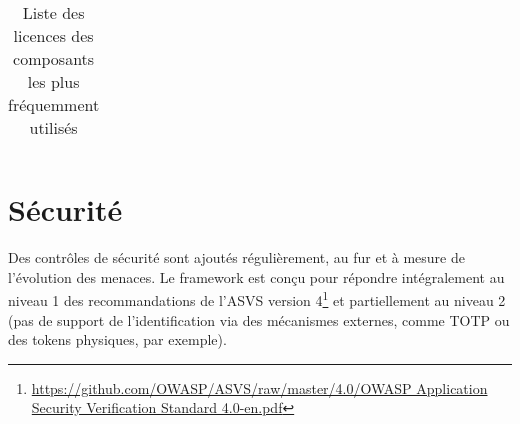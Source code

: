 \begin{longtable}{|>{\raggedright\arraybackslash}p{3cm}|p{6cm}|>{\raggedright\arraybackslash}p{1.5cm}|>{\raggedright\arraybackslash}p{1.5cm}|}
\caption{Liste des licences des composants les plus fréquemment utilisés}
\end{longtable}

\section{Sécurité}
Des contrôles de sécurité sont ajoutés régulièrement, au fur et à mesure de l'évolution des menaces. Le framework est conçu pour répondre intégralement au niveau 1 des recommandations de l'ASVS version 4\footnote{\href{https://github.com/OWASP/ASVS/raw/master/4.0/OWASP Application Security Verification Standard 4.0-en.pdf}{https://github.com/OWASP/ASVS/raw/master/4.0/OWASP Application Security Verification Standard 4.0-en.pdf}} et partiellement au niveau 2 (pas de support de l'identification via des mécanismes externes, comme TOTP ou des tokens physiques, par exemple).